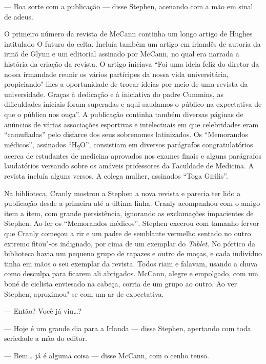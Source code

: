 --- Boa sorte com a publicação --- disse Stephen, acenando com a mão em sinal
de adeus.

O primeiro número da revista de McCann continha um longo artigo de Hughes
intitulado O futuro do celta.  Incluía também um artigo em irlandês de
autoria da irmã de Glynn e um editorial assinado por McCann, no qual era
narrada a história da criação da revista.  O artigo iniciava “Foi uma ideia
feliz do diretor da nossa irmandade reunir os vários partícipes da nossa vida
universitária, propiciando"-lhes a oportunidade de trocar ideias por meio de uma
revista da universidade.  Graças à dedicação e à iniciativa do padre Cummins,
as dificuldades iniciais foram superadas e aqui saudamos o público na
expectativa de que o público nos ouça”.  A publicação continha também diversas
páginas de anúncios de várias associações esportivas e intelectuais em que
celebridades eram “camufladas” pelo disfarce dos seus sobrenomes latinizados.
Os “Memorandos médicos”, assinados “H\textsubscript{2}O”, consistiam em
diversos parágrafos congratulatórios acerca de estudantes de medicina aprovados
nos exames finais e alguns parágrafos laudatórios versando sobre os amáveis
professores da Faculdade de Medicina.  A revista incluía alguns versos,
A colega mulher, assinados “Toga Girilis”.

Na biblioteca, Cranly mostrou a Stephen a nova revista e parecia ter lido a
publicação desde a primeira até a última linha.  Cranly acompanhou com o amigo
item a item, com grande persistência, ignorando as exclamações impacientes de
Stephen.  Ao ler os “Memorandos médicos”, Stephen execrou com tamanho fervor que
Cranly começou a rir e um padre de semblante vermelho sentado no outro extremo
fitou"-os indignado, por cima de um exemplar do \textit{Tablet.}  No pórtico da
biblioteca havia um pequeno grupo de rapazes e outro de moças, e cada indivíduo
tinha em mãos o seu exemplar da revista.  Todos riam e falavam, usando a chuva
como desculpa para ficarem ali abrigados.  McCann, alegre e empolgado, com um
boné de ciclista enviesado na cabeça, corria de um grupo ao outro.  Ao ver
Stephen, aproximou"-se com um ar de expectativa.

--- Então?  Você já viu\ldots{}?

--- Hoje é um grande dia para a Irlanda --- disse Stephen, apertando com toda
seriedade a mão do editor.

--- Bem\ldots{} já é alguma coisa --- disse McCann, com o cenho tenso.

